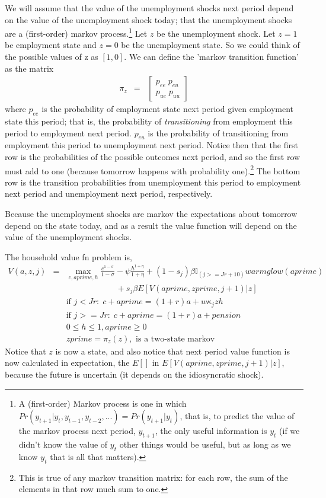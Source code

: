 We will assume that the value of the unemployment shocks next period depend on the value of the unemployment shock today; that the unemployment shocks are a (first-order) markov process.\footnote{A (first-order) Markov process is one in which $Pr(y_{t+1}|y_t,y_{t-1},y_{t-2},...)=Pr(y_{t+1}|y_t)$, that is, to predict the value of the markov process next period, $y_{t+1}$, the only useful information is $y_t$ (if we didn't know the value of $y_t$ other things would be useful, but as long as we know $y_t$ that is all that matters).} Let $z$ be the unemployment shock. Let $z=1$ be employment state and $z=0$ be the unemployment state. So we could think of the possible values of z as $[1,0]$. We can define the 'markov transition function' as the matrix
\begin{eqnarray*}
\pi_z &=& \begin{bmatrix}p_{ee} \; p_{eu} \\
                   p_{ue} \; p_{uu} \end{bmatrix}
\end{eqnarray*}
where $p_{ee}$ is the probability of employment state next period given employment state this period; that is, the probability of \textit{transitioning} from employment this period to employment next period. $p_{eu}$ is the probability of transitioning from employment this period to unemployment next period. Notice then that the first row is the probabilities of the possible outcomes next period, and so the first row must add to one (because tomorrow happens with probability one).\footnote{This is true of any markov transition matrix: for each row, the sum of the elements in that row much sum to one.} The bottom row is the transition probabilities from unemployment this period to employment next period and unemployment next period, respectively.

Because the unemployment shocks are markov the expectations about tomorrow depend on the state today, and as a result the value function will depend on the value of the unemployment shocks.

The household value fn problem is,
\begin{eqnarray*}
 V(a,z,j)&=& \max_{c,aprime,h} \frac{c^{1-\sigma}}{1-\sigma} - \psi \frac{h^{1+\eta}}{1+\eta} + (1-s_j)\beta   \mathbb{I}_{(j>=Jr+10)} warmglow(aprime)   \\
 && \quad \quad \quad \quad \quad \quad + s_j \beta E[V(aprime,zprime,j+1)|z] \\
&& \text{if }j<Jr: \; c+aprime=(1+r)a+w \kappa_j z h \\
&& \text{if }j>=Jr: \; c+aprime=(1+r)a +pension\\
&& 0\leq h \leq 1, aprime\geq 0 \\
&& zprime=\pi_z(z), \text{  is a two-state markov}
\end{eqnarray*}
Notice that $z$ is now a state, and also notice that next period value function is now calculated in expectation, the $E[]$ in $E[V(aprime,zprime,j+1)|z]$, because the future is uncertain (it depends on the idiosyncratic shock).

